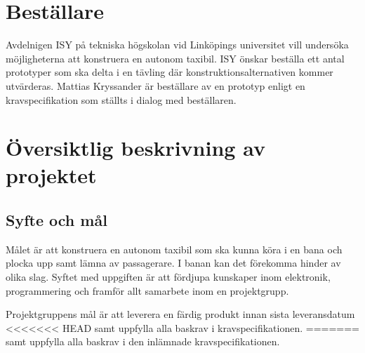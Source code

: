 \documentclass[projektplan/plan.tex]{subfiles}
\begin{document}
\section{Beställare}
Avdelnigen ISY på tekniska högskolan vid Linköpings universitet vill undersöka
möjligheterna att konstruera en autonom taxibil. ISY önskar beställa ett antal
prototyper som ska delta i en tävling där konstruktionsalternativen kommer
utvärderas. Mattias Kryssander är beställare av en prototyp enligt en
kravspecifikation som ställts i dialog med beställaren.

\section{Översiktlig beskrivning av projektet}
\subsection{Syfte och mål}
Målet är att konstruera en autonom taxibil som ska kunna köra i en bana och
plocka upp samt lämna av passagerare. I banan kan det förekomma hinder av olika
slag. Syftet med uppgiften är att fördjupa kunskaper inom elektronik,
programmering och framför allt samarbete inom en projektgrupp.

Projektgruppens mål är att leverera en färdig produkt innan sista leveransdatum
<<<<<<< HEAD
samt uppfylla alla baskrav i kravspecifikationen.
=======
samt uppfylla alla baskrav i den inlämnade kravspecifikationen.
\end{document}
